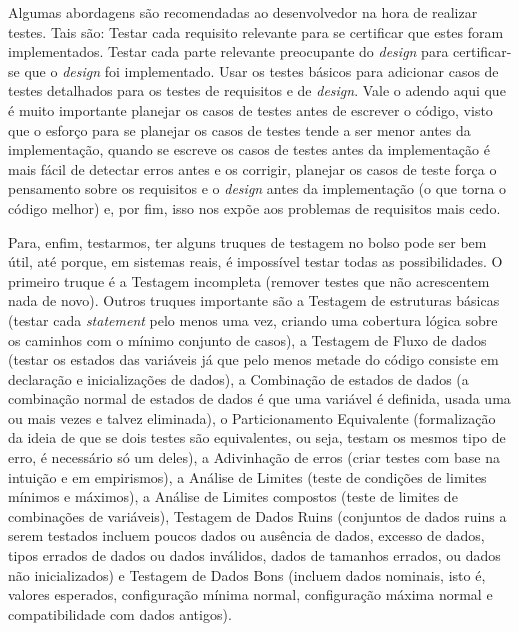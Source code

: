\documentclass[12pt, a4paper]{article}
\newcommand{\tit}[1]{\textit{#1}}
\begin{document}
    Algumas abordagens são recomendadas ao desenvolvedor na hora de realizar testes. Tais são: Testar cada requisito relevante para se certificar que estes foram implementados. Testar cada parte relevante preocupante do \tit{design} para certificar-se que o \tit{design} foi implementado. Usar os testes básicos para adicionar casos de testes detalhados para os testes de requisitos e de \tit{design}. Vale o adendo aqui que é muito importante planejar os casos de testes antes de escrever o código, visto que o esforço para se planejar os casos de testes tende a ser menor antes da implementação, quando se escreve os casos de testes antes da implementação é mais fácil de detectar erros antes e os corrigir, planejar os casos de teste força o pensamento sobre os requisitos e o \tit{design} antes da implementação (o que torna o código melhor) e, por fim, isso nos expõe aos problemas de requisitos mais cedo.
 
    Para, enfim, testarmos, ter alguns truques de testagem no bolso pode ser bem útil, até porque, em sistemas reais, é impossível testar todas as possibilidades. O primeiro truque é a Testagem incompleta (remover testes que não acrescentem nada de novo). Outros truques importante são a Testagem de estruturas básicas (testar cada \tit{statement} pelo menos uma vez, criando uma cobertura lógica sobre os caminhos com o mínimo conjunto de casos), a Testagem de Fluxo de dados (testar os estados das variáveis já que pelo menos metade do código consiste em declaração e inicializações de dados), a Combinação de estados de dados (a combinação normal de estados de dados é que uma variável é definida, usada uma ou mais vezes e talvez eliminada), o Particionamento Equivalente (formalização da ideia de que se dois testes são equivalentes, ou seja, testam os mesmos tipo de erro, é necessário só um deles), a Adivinhação de erros (criar testes com base na intuição e em empirismos), a Análise de Limites (teste de condições de limites mínimos e máximos), a Análise de Limites compostos (teste de limites de combinações de variáveis), Testagem de Dados Ruins (conjuntos de dados ruins a serem testados incluem poucos dados ou ausência de dados, excesso de dados, tipos errados de dados ou dados inválidos, dados de tamanhos errados, ou dados não inicializados) e Testagem de Dados Bons (incluem dados nominais, isto é, valores esperados, configuração mínima normal, configuração máxima normal e compatibilidade com dados antigos).
    
\end{document}
